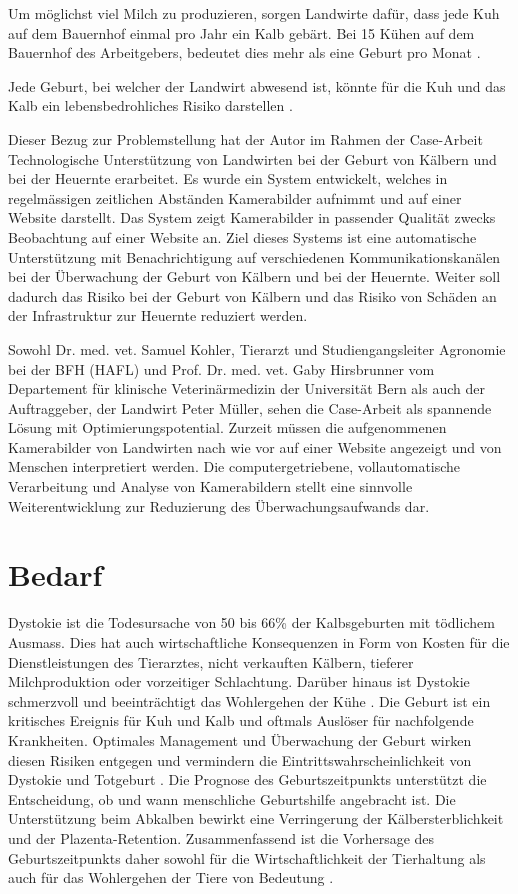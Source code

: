 Um möglichst viel Milch zu produzieren, sorgen Landwirte dafür, dass jede Kuh auf dem Bauernhof einmal pro Jahr ein Kalb gebärt. Bei 15 Kühen auf dem Bauernhof des Arbeitgebers, bedeutet dies mehr als eine Geburt pro Monat \citep{Muller2019}.

Jede Geburt, bei welcher der Landwirt abwesend ist, könnte  für die Kuh und das Kalb ein lebensbedrohliches Risiko darstellen \citep{Muller2019}. 

Dieser Bezug zur Problemstellung hat der Autor im Rahmen der Case-Arbeit \flqq{}Technologische Unterstützung von Landwirten bei der Geburt von Kälbern und bei der Heuernte\frqq{} erarbeitet. Es wurde ein System entwickelt, welches in regelmässigen zeitlichen Abständen Kamerabilder aufnimmt und auf einer Website darstellt. Das System zeigt Kamerabilder in passender Qualität zwecks Beobachtung auf einer Website an. Ziel dieses Systems ist eine automatische Unterstützung mit Benachrichtigung auf verschiedenen Kommunikationskanälen bei der Überwachung der Geburt von Kälbern und bei der Heuernte. Weiter soll dadurch das Risiko bei der Geburt von Kälbern und das Risiko von Schäden an der Infrastruktur zur Heuernte reduziert werden.

Sowohl Dr. med. vet. Samuel Kohler, Tierarzt und Studiengangsleiter Agronomie bei der BFH (HAFL) und Prof. Dr. med. vet. Gaby Hirsbrunner vom Departement für klinische Veterinärmedizin der Universität Bern als auch der Auftraggeber, der Landwirt Peter Müller, sehen die Case-Arbeit als spannende Lösung mit Optimierungspotential. Zurzeit müssen die aufgenommenen Kamerabilder von Landwirten nach wie vor auf einer Website angezeigt und von Menschen interpretiert werden. Die computergetriebene, vollautomatische Verarbeitung und Analyse von Kamerabildern stellt eine sinnvolle Weiterentwicklung zur Reduzierung des Überwachungsaufwands dar. 

\section{Bedarf}

Dystokie ist die Todesursache von 50 bis 66\% der Kalbsgeburten mit tödlichem Ausmass. Dies hat auch wirtschaftliche Konsequenzen in Form von Kosten für die Dienstleistungen des Tierarztes, nicht verkauften Kälbern, tieferer Milchproduktion oder vorzeitiger Schlachtung. Darüber hinaus ist Dystokie schmerzvoll und beeinträchtigt das Wohlergehen der Kühe \citep[S. 1]{Saint-Dizier2015}. Die Geburt ist ein kritisches Ereignis für Kuh und Kalb und oftmals Auslöser für nachfolgende Krankheiten. Optimales Management und Überwachung der Geburt wirken diesen Risiken entgegen und vermindern die Eintrittswahrscheinlichkeit von Dystokie und Totgeburt \citep[S. 1]{Lange2017}. Die Prognose des Geburtszeitpunkts unterstützt die Entscheidung, ob und wann menschliche Geburtshilfe angebracht ist. Die Unterstützung beim Abkalben bewirkt eine Verringerung der Kälbersterblichkeit und der \gls{Plazenta}-\gls{Retention}. Zusammenfassend ist die Vorhersage des Geburtszeitpunkts daher sowohl für die Wirtschaftlichkeit der Tierhaltung als auch für das Wohlergehen der Tiere von Bedeutung \citep[S. 1]{Saint-Dizier2015}.  


